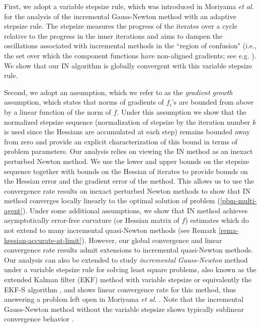 \documentclass[final,numbook]{svjour3}
\begin{document}
First, we adopt a variable stepsize rule, which was introduced in Moriyama \textit{et al}. \cite{AlgEkfs2003} for the analysis of the incremental Gauss-Newton method with an adaptive stepsize rule. The stepsize measures the progress of the iterates over a cycle relative to the progress in the inner iterations and aims to dampen the oscillations associated with incremental methods in the ``region of confusion" (i.e., the set over which the component functions have non-aligned gradients; see e.g. \cite[Example 1.5.5]{Bertsekas99nonlinear}). We show that our IN algorithm is globally convergent with this variable stepsize rule. 

Second, we adopt an assumption, which we refer to as the {\it gradient growth} assumption, which states that norms of gradients of $f_i$'s are bounded from above by a linear function of the norm of $f$. Under this assumption we show that the normalized stepsize sequence (normalization of stepsize by the iteration number $k$ is used since the Hessians are accumulated at each step) remains bounded away from zero and provide an explicit characterization of this bound in terms of problem parameters. Our analysis relies on viewing the IN method as an inexact perturbed Newton method. We use the lower and upper bounds on the stepsize sequence together with bounds on the Hessian of iterates to provide bounds on the Hessian error and the gradient error of the method. This allows us to use the convergence rate results on inexact perturbed Newton methods to show that 
IN method converges locally linearly to the optimal solution of problem (\ref{pbm-multi-agent}). Under some additional assumptions, we show that IN method achieves asymptotically error-free curvature (or Hessian matrix of $f$) estimates which do not extend to many incremental quasi-Newton methods (see Remark \ref{rema-hessian-accurate-at-limit}). However, our global convergence and linear convergence rate results admit extensions to incremental quasi-Newton methods. Our analysis can also be extended to study \textit{incremental Gauss-Newton} method under a variable stepsize rule for solving least square problems, also known as the extended Kalman filter (EKF) method with variable stepsize or equivalently the EKF-S algorithm \cite{AlgEkfs2003}, and shows linear convergence rate for this method, thus answering a problem left open in Moriyama \textit{et al}. \cite[\S 7]{AlgEkfs2003}. Note that the incremental Gauss-Newton method without the variable stepsize shows typically sublinear convergence behavior \cite{Bertsekas1996incremental, Davidon76, Bertsekas99nonlinear}.
\end{document}

